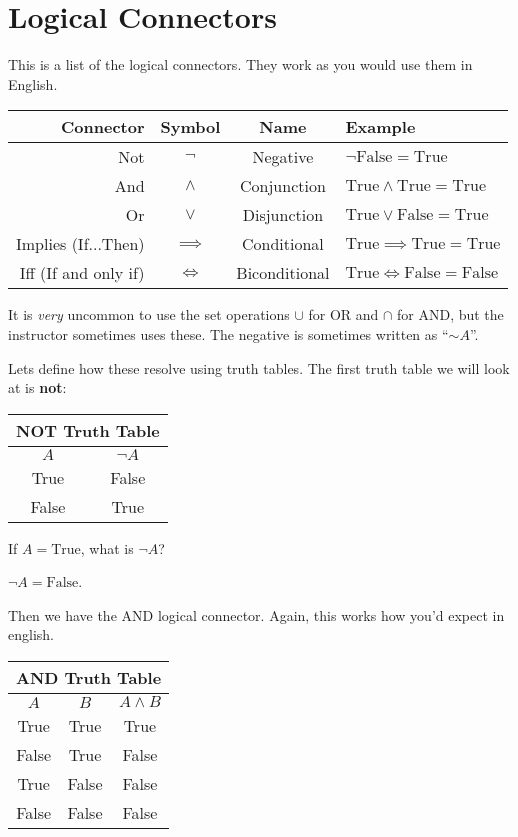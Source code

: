 \section{Logical Connectors}

This is a list of the logical connectors. They work as you would use them in English.

\medskip
\begin{tabular}{r|c|c|l}
	\hline
	Connector & Symbol & Name & Example\\
	\hline
	Not & $\neg$ & Negative & $\neg \text{False} = \text{True}$\\
	And & $\land$ & Conjunction & $\text{True} \land \text{True} = \text{True} $\\
	Or & $\lor$ & Disjunction & $\text{True} \lor \text{False} = \text{True}$\\
	Implies (If...Then) & $\implies$ & Conditional & $\text{True} \implies \text{True} = \text{True}$\\
	Iff (If and only if) & $\iff$ & Biconditional & $\text{True} \iff \text{False} = \text{False}$\\
\hline
\end{tabular}
\medskip

\begin{boxnotation*}{}{}
	It is \emph{very} uncommon to use the set operations $\cup$ for OR and $\cap$ for AND, but the instructor sometimes uses these. The negative is sometimes written as ``$\sim A$''.
\end{boxnotation*}

Lets define how these resolve using truth tables. The first truth table we will look at is {\bf not}:

\medskip
\begin{tabular}{c|c}
	\hline
	\multicolumn{2}{c}{NOT Truth Table}\\
	\hline
	$A$ & $\neg A$\\
	\hline
	True & False\\
	False & True\\
	\hline
\end{tabular}
\medskip

\begin{boxexample}{}{}
	If $A=\text{True}$, what is $\neg A$?
	
	$\neg A=\text{False}$.
\end{boxexample}

Then we have the AND logical connector. Again, this works how you'd expect in english.

\medskip
\begin{tabular}{c|c|c}
	\hline
	\multicolumn{3}{c}{AND Truth Table}\\
	\hline
	$A$ & $B$ & $A \land B$\\
	\hline
	True & True & True\\
	False & True & False\\
	True & False & False\\
	False & False & False\\
	\hline
\end{tabular}
\medskip

